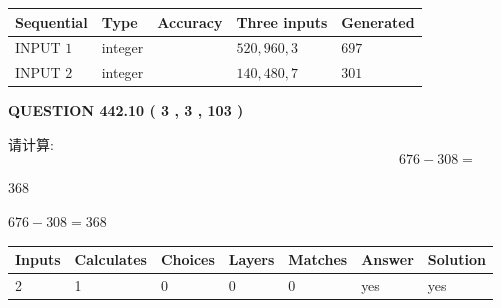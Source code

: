 \documentclass{ctexart}
\begin{document}
   
  
  
\noindent\begin{tabular}{|l|l|l|l|l|}
\hline
 Sequential & Type & Accuracy & Three inputs & Generated \\ 
\hline
 
 
  INPUT $  1 $ & integer &  & $
 520
 , 
 960
 , 
 3
 $ & $ 697 $ 
 \\  \hline  
 
 
  INPUT $  2 $ & integer &  & $
 140
 , 
 480
 , 
 7
 $ & $ 301 $ 
 \\  \hline  
 \end{tabular}
   
   
  
\vspace{0.2in}
  
{\textbf{\Large{QUESTION
442.10 
 ( 3 , 3 , 103 )
}}}
  
  
 
请计算:
\begin{equation}
676 -   %
308 = \nonumber
\end{equation}
 
 
 
\noindent{}
 
 

368
 
 
\noindent{}
 
 

 
 
 
\noindent{}
 
 

$ %
676 -  %
308=   %
368$
 
 
\noindent{}
 
 

 
   
   
   
   
\noindent\begin{tabular}{|l|l|l|l|l|l|l|}
 \hline
Inputs & Calculates & Choices & Layers & Matches & Answer & Solution \\ \hline
 2  & 
 1  & 
 0
  & 
 0  & 
 0  & 
  yes & 
  yes 
  \\ \hline
 \end{tabular}
   
\end{document}
